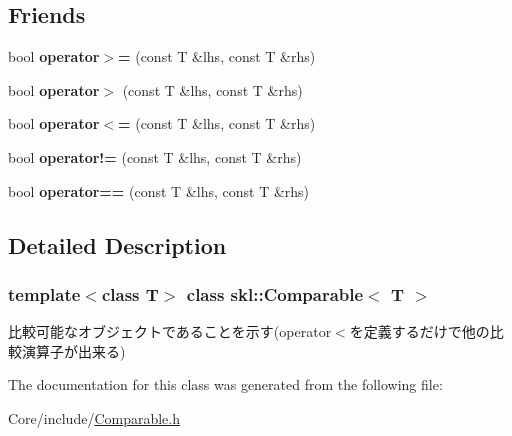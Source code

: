 \subsection*{Friends}
\begin{DoxyCompactItemize}
\item 
\hypertarget{classskl_1_1_comparable_a2cde4518a54e4900eac612f536e5303e}{}\label{classskl_1_1_comparable_a2cde4518a54e4900eac612f536e5303e} 
bool {\bfseries operator$>$=} (const T \&lhs, const T \&rhs)
\item 
\hypertarget{classskl_1_1_comparable_a55af6cb1ca766f6fba5fe1a6ff3d7b54}{}\label{classskl_1_1_comparable_a55af6cb1ca766f6fba5fe1a6ff3d7b54} 
bool {\bfseries operator$>$} (const T \&lhs, const T \&rhs)
\item 
\hypertarget{classskl_1_1_comparable_a3c5ac45ccee4dd4a74a67e6886309072}{}\label{classskl_1_1_comparable_a3c5ac45ccee4dd4a74a67e6886309072} 
bool {\bfseries operator$<$=} (const T \&lhs, const T \&rhs)
\item 
\hypertarget{classskl_1_1_comparable_aa9434de986958333c8a4114e04b83f1a}{}\label{classskl_1_1_comparable_aa9434de986958333c8a4114e04b83f1a} 
bool {\bfseries operator!=} (const T \&lhs, const T \&rhs)
\item 
\hypertarget{classskl_1_1_comparable_ae55aaa8ab31c31ebc41b762886835b05}{}\label{classskl_1_1_comparable_ae55aaa8ab31c31ebc41b762886835b05} 
bool {\bfseries operator==} (const T \&lhs, const T \&rhs)
\end{DoxyCompactItemize}


\subsection{Detailed Description}
\subsubsection*{template$<$class T$>$\newline
class skl\+::\+Comparable$<$ T $>$}

比較可能なオブジェクトであることを示す(operator$<$を定義するだけで他の比較演算子が出来る) 

The documentation for this class was generated from the following file\+:\begin{DoxyCompactItemize}
\item 
Core/include/\hyperlink{_comparable_8h}{Comparable.\+h}\end{DoxyCompactItemize}
